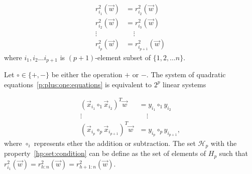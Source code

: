 \begin{align} 
    r^{2}_{i_1}(\vec{w}) &= r^{2}_{i_2}(\vec{w}) \label{p:plus:one:equations}   \\
    r^{2}_{i_2}(\vec{w}) &= r^{2}_{i_3}(\vec{w}) \nonumber  \\
    \vdots \ \ \  & \ \ \ \  \ \vdots  \nonumber \\ 
    r^{2}_{i_p}(\vec{w}) &=  r^{2}_{i_{p+1}}(\vec{w}) \nonumber 
\end{align}
where $i_1, i_2 \ldots i_{p+1}$  is $(p+1)$-element subset of $\{{1, 2, \ldots n \}}$.


Let $\circ \in \{{+, -\}}$ be either the operation $+$ or $-$. The system of quadratic equations~\eqref{p:plus:one:equations} is equivalent to $2^p$ linear systems

\begin{align} 
    (\vec{x}_{i_1} \circ_1 \vec {x}_{i_2} )^T \vec{w} &= y_{i_1} \circ_1 y_{i_2} \label{p:plus:one:equations:linear}   \\
    \vdots \ \ \  & \ \ \ \  \ \vdots  \nonumber \\ 
    (\vec{x}_{i_p} \circ_p \vec {x}_{i_{p+1}} )^T \vec{w} &= y_{i_p} \circ_p y_{i_{p+1}}, \nonumber 
\end{align}
where $\circ_i$ represents ether the addition or subtraction.
The set $\mathcal{H}_p$ with the property~\eqref{hp:set:condition} can be define as the set of elements of $H_p$ such that $r_{i_1}^2(\vec{w}) = r_{h:n}^2(\vec{w}) = r_{h+1:n}^2(\vec{w})$.

